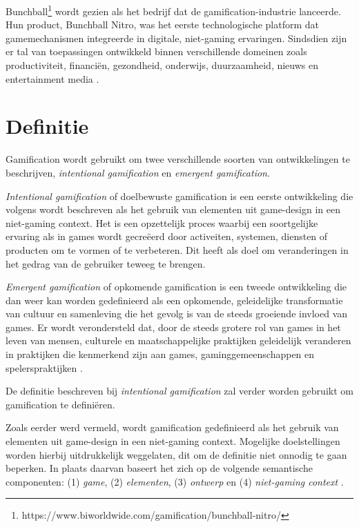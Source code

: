 Bunchball\footnote{https://www.biworldwide.com/gamification/bunchball-nitro/} wordt gezien als het bedrijf dat de gamification-industrie lanceerde. Hun product, Bunchball Nitro, was het eerste technologische platform dat gamemechanismen integreerde in digitale, niet-gaming ervaringen. Sindsdien zijn er tal van toepassingen ontwikkeld binnen verschillende domeinen zoals productiviteit, financiën, gezondheid, onderwijs, duurzaamheid, nieuws en entertainment media \autocite{Groh2012}.

\section{Definitie}

Gamification wordt gebruikt om twee verschillende soorten van ontwikkelingen te beschrijven, \textit{intentional gamification} en \textit{emergent gamification}.

\textit{Intentional gamification} of doelbewuste gamification is een eerste ontwikkeling die volgens \textcite{Deterding2011} wordt beschreven als het gebruik van elementen uit game-design in een niet-gaming context. Het is een opzettelijk proces waarbij een soortgelijke ervaring als in games wordt gecreëerd door activeiten, systemen, diensten of producten om te vormen of te verbeteren. Dit heeft als doel om veranderingen in het gedrag van de gebruiker teweeg te brengen.

\textit{Emergent gamification} of opkomende gamification is een tweede ontwikkeling die dan weer kan worden gedefinieerd als een opkomende, geleidelijke transformatie van cultuur en samenleving die het gevolg is van de steeds groeiende invloed van games. Er wordt verondersteld dat, door de steeds grotere rol van games in het leven van mensen, culturele en maatschappelijke praktijken geleidelijk veranderen in praktijken die kenmerkend zijn aan games, gaminggemeenschappen en spelerspraktijken  \autocite{Hamari2019}.

De definitie beschreven bij \textit{intentional gamification} zal verder worden gebruikt om gamification te definiëren.

Zoals eerder werd vermeld, wordt gamification gedefinieerd als het gebruik van elementen uit game-design in een niet-gaming context. Mogelijke doelstellingen worden hierbij uitdrukkelijk weggelaten, dit om de definitie niet onnodig te gaan beperken. In plaats daarvan baseert het zich op de volgende semantische componenten: (1) \textit{game}, (2) \textit{elementen}, (3) \textit{ontwerp} en (4) \textit{niet-gaming context} \autocite{Sailer2016}.

